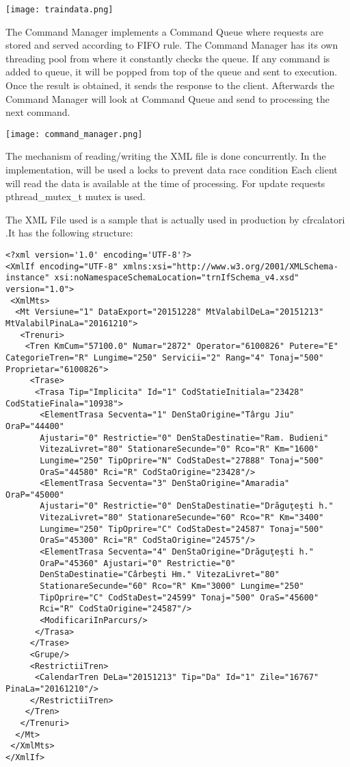 \documentclass[runningheads]{llncs}
\begin{document}
\texttt{[image: traindata.png]}

The Command Manager implements a Command Queue where requests are stored and served according to FIFO rule. The Command Manager has its own threading pool from where it constantly checks the queue. If any command is added to queue, it will be popped from top of the queue and sent to execution. Once the result is obtained, it sends the response to the client. Afterwards the Command Manager will look at Command Queue and send to processing the next command.

\hspace{+1in}
\texttt{[image: command\_manager.png]}


The mechanism of reading/writing the XML file is done concurrently. In the implementation, will be used a locks to prevent data race condition\cite{ref_url2} Each client will read the data is available at the time of processing. For update requests pthread\_mutex\_t mutex is used.

The XML File used is a sample that is actually used in production by cfrcalatori \cite{datagov}.It has the following structure:

\begin{lstlisting}
<?xml version='1.0' encoding='UTF-8'?>
<XmlIf encoding="UTF-8" xmlns:xsi="http://www.w3.org/2001/XMLSchema-instance" xsi:noNamespaceSchemaLocation="trnIfSchema_v4.xsd" version="1.0">
 <XmlMts>
  <Mt Versiune="1" DataExport="20151228" MtValabilDeLa="20151213" MtValabilPinaLa="20161210">
   <Trenuri>
    <Tren KmCum="57100.0" Numar="2872" Operator="6100826" Putere="E" CategorieTren="R" Lungime="250" Servicii="2" Rang="4" Tonaj="500" Proprietar="6100826">
     <Trase>
      <Trasa Tip="Implicita" Id="1" CodStatieInitiala="23428" CodStatieFinala="10938">
       <ElementTrasa Secventa="1" DenStaOrigine="Târgu Jiu" OraP="44400" 
       Ajustari="0" Restrictie="0" DenStaDestinatie="Ram. Budieni" 
       VitezaLivret="80" StationareSecunde="0" Rco="R" Km="1600" 
       Lungime="250" TipOprire="N" CodStaDest="27888" Tonaj="500" 
       OraS="44580" Rci="R" CodStaOrigine="23428"/>
       <ElementTrasa Secventa="3" DenStaOrigine="Amaradia" OraP="45000"
       Ajustari="0" Restrictie="0" DenStaDestinatie="Drăguţeşti h."
       VitezaLivret="80" StationareSecunde="60" Rco="R" Km="3400"
       Lungime="250" TipOprire="C" CodStaDest="24587" Tonaj="500"
       OraS="45300" Rci="R" CodStaOrigine="24575"/>
       <ElementTrasa Secventa="4" DenStaOrigine="Drăguţeşti h."
       OraP="45360" Ajustari="0" Restrictie="0"
       DenStaDestinatie="Cârbeşti Hm." VitezaLivret="80"
       StationareSecunde="60" Rco="R" Km="3000" Lungime="250"
       TipOprire="C" CodStaDest="24599" Tonaj="500" OraS="45600"
       Rci="R" CodStaOrigine="24587"/>
       <ModificariInParcurs/>
      </Trasa>
     </Trase>
     <Grupe/>
     <RestrictiiTren>
      <CalendarTren DeLa="20151213" Tip="Da" Id="1" Zile="16767" PinaLa="20161210"/>
     </RestrictiiTren>
    </Tren>
   </Trenuri>
  </Mt>
 </XmlMts>
</XmlIf>
\end{lstlisting}
\end{document}

